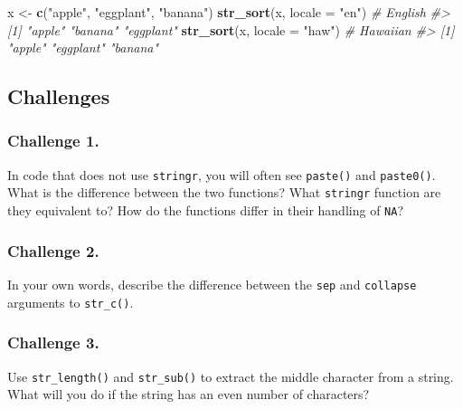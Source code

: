 \documentclass[
]{book}
\newenvironment{Shaded}{\begin{snugshade}}{\end{snugshade}}
\newcommand{\CommentTok}[1]{\textcolor[rgb]{0.56,0.35,0.01}{\textit{#1}}}
\newcommand{\DataTypeTok}[1]{\textcolor[rgb]{0.13,0.29,0.53}{#1}}
\newcommand{\KeywordTok}[1]{\textcolor[rgb]{0.13,0.29,0.53}{\textbf{#1}}}
\newcommand{\NormalTok}[1]{#1}
\newcommand{\StringTok}[1]{\textcolor[rgb]{0.31,0.60,0.02}{#1}}
\begin{document}
\begin{Shaded}
\begin{Highlighting}[]
\NormalTok{x <-}\StringTok{ }\KeywordTok{c}\NormalTok{(}\StringTok{"apple"}\NormalTok{, }\StringTok{"eggplant"}\NormalTok{, }\StringTok{"banana"}\NormalTok{)}
\KeywordTok{str_sort}\NormalTok{(x, }\DataTypeTok{locale =} \StringTok{"en"}\NormalTok{)  }\CommentTok{# English}
\CommentTok{#> [1] "apple"    "banana"   "eggplant"}
\KeywordTok{str_sort}\NormalTok{(x, }\DataTypeTok{locale =} \StringTok{"haw"}\NormalTok{) }\CommentTok{# Hawaiian}
\CommentTok{#> [1] "apple"    "eggplant" "banana"}
\end{Highlighting}
\end{Shaded}

\hypertarget{challenges-14}{%
\subsection{Challenges}\label{challenges-14}}

\hypertarget{challenge-1.-11}{%
\subsubsection*{Challenge 1.}\label{challenge-1.-11}}

In code that does not use \texttt{stringr}, you will often see \texttt{paste()} and \texttt{paste0()}. What is the difference between the two functions? What \texttt{stringr} function are they equivalent to? How do the functions differ in their handling of \texttt{NA}?

\hypertarget{challenge-2.-10}{%
\subsubsection*{Challenge 2.}\label{challenge-2.-10}}

In your own words, describe the difference between the \texttt{sep} and \texttt{collapse} arguments to \texttt{str\_c()}.

\hypertarget{challenge-3.-7}{%
\subsubsection*{Challenge 3.}\label{challenge-3.-7}}

Use \texttt{str\_length()} and \texttt{str\_sub()} to extract the middle character from
a string. What will you do if the string has an even number of characters?
\end{document}
